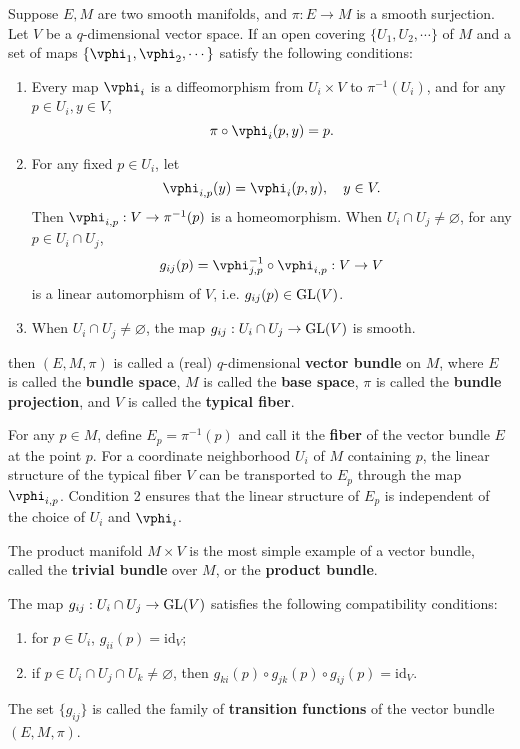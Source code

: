\documentclass[11pt]{article}
\begin{document}
\begin{definition}
    Suppose $E, M$ are two smooth manifolds, and $\pi : E \rightarrow M$ is a smooth surjection. Let $V$ be a $q$-dimensional vector space. If an open covering $\{U_1, U_2, \cdots\}$ of $M$ and a set of maps $\{\vphi_1, \vphi_2, \cdots\}$ satisfy the following conditions:
    \begin{enumerate}
        \item Every map $\vphi_i$ is a diffeomorphism from $U_i \times V$ to $\pi^{-1}(U_i)$, and for any $p \in U_i, y \in V$, $$\pi \circ \vphi_i(p, y) = p.$$
        \item For any fixed $p \in U_i$, let $$\vphi_{i, p}(y) = \vphi_i(p, y), \quad y \in V.$$ Then $\vphi_{i, p} : V \rightarrow \pi^{-1}(p)$ is a homeomorphism. When $U_i \cap U_j \neq \varnothing$, for any $p \in U_i \cap U_j$, $$g_{ij}(p) = \vphi^{-1}_{j, p} \circ \vphi_{i, p} : V \rightarrow V$$ is a linear automorphism of $V$, i.e. $g_{ij}(p) \in \text{GL}(V)$.
        \item When $U_i \cap U_j \neq \varnothing$, the map $g_{ij} : U_i \cap U_j \rightarrow \text{GL}(V)$ is smooth. 
    \end{enumerate}
    then $(E, M, \pi)$ is called a (real) $q$-dimensional \textbf{vector bundle} on $M$, where $E$ is called the \textbf{bundle space}, $M$ is called the \textbf{base space}, $\pi$ is called the \textbf{bundle projection}, and $V$ is called the \textbf{typical fiber}. 
\end{definition}

For any $p \in M$, define $E_p = \pi^{-1}(p)$ and call it the \textbf{fiber} of the vector bundle $E$ at the point $p$. For a coordinate neighborhood $U_i$ of $M$ containing $p$, the linear structure of the typical fiber $V$ can be transported to $E_p$ through the map $\vphi_{i, p}$. Condition 2 ensures that the linear structure of $E_p$ is independent of the choice of $U_i$ and $\vphi_i$. 

The product manifold $M \times V$ is the most simple example of a vector bundle, called the \textbf{trivial bundle} over $M$, or the \textbf{product bundle}. 

The map $g_{ij} : U_i \cap U_j \rightarrow \text{GL}(V)$ satisfies the following compatibility conditions: 
\begin{enumerate}
    \item for $p \in U_i$, $g_{ii}(p) = \text{id}_V$;
    \item if $p \in U_i \cap U_j \cap U_k \neq \varnothing$, then $g_{ki}(p) \circ g_{jk}(p) \circ g_{ij}(p) = \text{id}_V$.
\end{enumerate}
The set $\{g_{ij}\}$ is called the family of \textbf{transition functions} of the vector bundle $(E, M, \pi)$.
\end{document}
